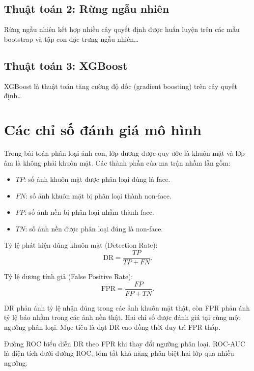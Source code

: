 \documentclass[12pt,a4paper,oneside]{report}
\begin{document}
\subsection{Thuật toán 2: Rừng ngẫu nhiên}
Rừng ngẫu nhiên \cite{breiman2001} kết hợp nhiều cây quyết định được huấn
luyện trên các mẫu bootstrap và tập con đặc trưng ngẫu nhiên\dots

\subsection{Thuật toán 3: XGBoost}
XGBoost \cite{chen2016} là thuật toán tăng cường độ dốc (gradient boosting)
trên cây quyết định\dots

\section{Các chỉ số đánh giá mô hình}
Trong bài toán phân loại ảnh con, lớp dương được quy ước
là khuôn mặt và lớp âm là không phải khuôn mặt.
Các thành phần của ma trận nhầm lẫn gồm:

\begin{itemize}
    \item $TP$: số ảnh khuôn mặt được phân loại đúng là face.
    \item $FN$: số ảnh khuôn mặt bị phân loại thành non-face.
    \item $FP$: số ảnh nền bị phân loại nhầm thành face.
    \item $TN$: số ảnh nền được phân loại đúng là non-face.
\end{itemize}

Tỷ lệ phát hiện đúng khuôn mặt (Detection Rate):
\begin{equation}
    \mathrm{DR} = \frac{TP}{TP+FN}.
    \label{eq:dr}
\end{equation}

Tỷ lệ dương tính giả (False Positive Rate):
\begin{equation}
    \mathrm{FPR} = \frac{FP}{FP+TN}.
    \label{eq:fpr}
\end{equation}

DR phản ánh tỷ lệ nhận đúng trong các ảnh khuôn mặt thật,
còn FPR phản ánh tỷ lệ báo nhầm trong các ảnh nền thật.
Hai chỉ số được đánh giá tại cùng một ngưỡng phân loại.
Mục tiêu là đạt DR cao đồng thời duy trì FPR thấp.

Đường ROC biểu diễn DR theo FPR khi thay đổi ngưỡng
phân loại. ROC-AUC là diện tích dưới đường ROC,
tóm tắt khả năng phân biệt hai lớp qua nhiều ngưỡng.
\end{document}
